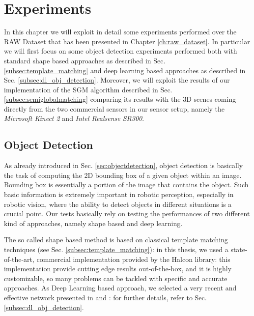 \chapter{Experiments}\label{ch:experiments}
In this chapter we will exploit in detail some experiments performed over the RAW Dataset that has been presented in Chapter \ref{ch:raw_dataset}. In particular we will first focus on some object detection experiments performed both with standard shape based approaches as described in Sec. \ref{subsec:template_matching} and deep learning based approaches as described in Sec. \ref{subsec:dl_obj_detection}. Moreover, we will exploit the results of our implementation of the SGM algorithm described in Sec. \ref{subsec:semiglobalmatching} comparing its results with the 3D scenes coming directly from the two commercial sensors in our sensor setup, namely the \emph{Microsoft Kinect 2} and \emph{Intel Realsense SR300}.


\section{Object Detection}\label{sec:exp_object_detection}
As already introduced in Sec. \ref{sec:objectdetection}, object detection is basically the task of computing the 2D bounding box of a given object within an image. Bounding box is essentially a portion of the image that contains the object. Such basic information is extremely important in robotic perception, especially in robotic vision, where the ability to detect objects in different situations is a crucial point. Our tests basically rely on testing the performances of two different kind of approaches, namely shape based and deep learning.

The so called shape based method is based on classical template matching techniques (see Sec. \ref{subsec:template_matching}): in this thesis, we used a state-of-the-art, commercial implementation provided by the Halcon library: this implementation provide cutting edge results out-of-the-box, and it is highly customizable, so many problems can be tackled with specific and accurate approaches. As Deep Learning based approach, we selected a very recent and effective network presented in \cite{Redmon2017YOLO2} and \cite{Redmon2016YOLO}: for further details, refer to Sec. \ref{subsec:dl_obj_detection}.

